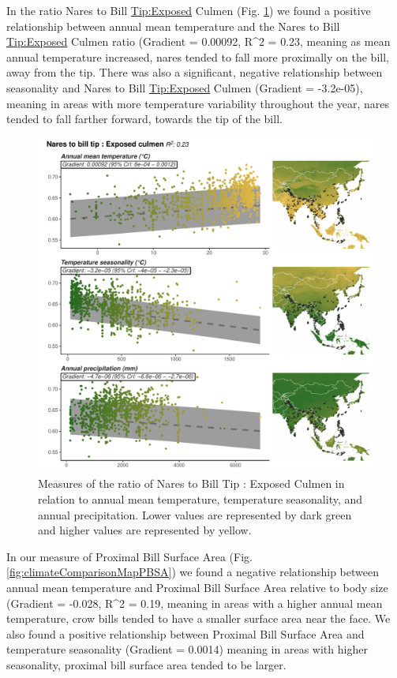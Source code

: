 \documentclass[10pt,a4paper]{article}
\begin{document}
In the ratio Nares to Bill \url{Tip:Exposed} Culmen (Fig. \ref{fig:climateComparisonMapNtBTExCu}) we found a positive relationship between annual mean temperature and the Nares to Bill \url{Tip:Exposed} Culmen ratio (Gradient = 0.00092, R\^{}2 = 0.23, meaning as mean annual temperature increased, nares tended to fall more proximally on the bill, away from the tip.
There was also a significant, negative relationship between seasonality and Nares to Bill \url{Tip:Exposed} Culmen (Gradient = -3.2e-05), meaning in areas with more temperature variability throughout the year, nares tended to fall farther forward, towards the tip of the bill.

\begin{figure}
\includegraphics[width=0.9\linewidth]{../Figures/climMap_NtBT.ExCu} \caption{Measures of the ratio of Nares to Bill Tip : Exposed Culmen in relation to annual mean temperature, temperature seasonality, and annual precipitation. Lower values are represented by dark green and higher values are represented by yellow.}\label{fig:climateComparisonMapNtBTExCu}
\end{figure}

In our measure of Proximal Bill Surface Area (Fig. \ref{fig:climateComparisonMapPBSA}) we found a negative relationship between annual mean temperature and Proximal Bill Surface Area relative to body size (Gradient = -0.028, R\^{}2 = 0.19, meaning in areas with a higher annual mean temperature, crow bills tended to have a smaller surface area near the face.
We also found a positive relationship between Proximal Bill Surface Area and temperature seasonality (Gradient = 0.0014) meaning in areas with higher seasonality, proximal bill surface area tended to be larger.
\end{document}
